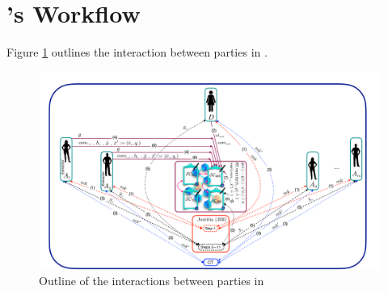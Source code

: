 

\section{\withRew's Workflow}\label{sec::ANE-workflow}
Figure \ref{fig:parties-interactions-in-ANE} outlines the interaction between parties in \withRew.


\begin{figure}[htp]
    \centering
    \includegraphics[width=13cm]{Diag-2.pdf}
     \vspace{-2mm}
    \caption{Outline of the interactions between parties in \withRew}\label{fig:parties-interactions-in-ANE}
\end{figure}


